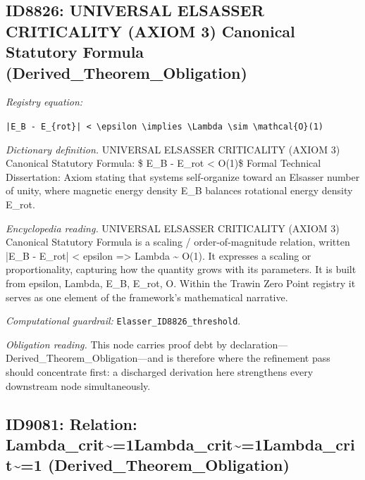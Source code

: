 \documentclass[11pt]{article}
\theoremstyle{remark}
\begin{document}
\subsection{ID8826: UNIVERSAL ELSASSER CRITICALITY (AXIOM 3) Canonical Statutory Formula (Derived\_Theorem\_Obligation)}

\noindent\textit{Registry equation:}\par
{\small\texttt{|E\_B - E\_\{rot\}| < \textbackslash{}epsilon \textbackslash{}implies \textbackslash{}Lambda \textbackslash{}sim \textbackslash{}mathcal\{O\}(1)}}\par\medskip
\noindent\textit{Dictionary definition.} UNIVERSAL ELSASSER CRITICALITY (AXIOM 3) Canonical Statutory Formula: \$ E\_B - E\_rot < O(1)\$ Formal Technical Dissertation: Axiom stating that systems self-organize toward an Elsasser number of unity, where magnetic energy density E\_B balances rotational energy density E\_rot.\par\medskip
\noindent\textit{Encyclopedia reading.} UNIVERSAL ELSASSER CRITICALITY (AXIOM 3) Canonical Statutory Formula is a scaling / order-of-magnitude relation, written |E\_B - E\_rot| < epsilon => Lambda \textasciitilde{} O(1). It expresses a scaling or proportionality, capturing how the quantity grows with its parameters. It is built from epsilon, Lambda, E\_B, E\_rot, O. Within the Trawin Zero Point registry it serves as one element of the framework's mathematical narrative.
\par\medskip\noindent\textit{Computational guardrail:} \texttt{Elasser\_ID8826\_threshold}.
\par\medskip\noindent\textit{Obligation reading.} This node carries proof debt by declaration---Derived\_Theorem\_Obligation---and is therefore where the refinement pass should concentrate first: a discharged derivation here strengthens every downstream node simultaneously.

\subsection{ID9081: Relation: Lambda\_crit\textasciitilde{}=1Lambda\_crit\textasciitilde{}=1Lambda\_crit\textasciitilde{}=1 (Derived\_Theorem\_Obligation)}
\end{document}
